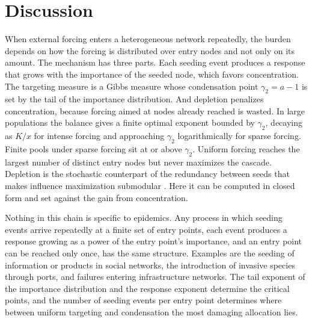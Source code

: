 \documentclass[pre,twocolumn,superscriptaddress,amsmath,amssymb,floatfix]{revtex4-2}
\begin{document}
\section{Discussion}\label{sec:discussion}
When external forcing enters a heterogeneous network repeatedly, the burden
depends on how the forcing is distributed over entry nodes and not only on its
amount. The mechanism has three parts. Each seeding event produces a response that grows
with the importance of the seeded node, which favors concentration. The
targeting measure is a Gibbs measure whose condensation point $\gamma_2=a-1$ is set by
the tail of the importance distribution. And depletion penalizes
concentration, because forcing aimed at nodes already reached is wasted. In large
populations the balance gives a finite optimal exponent bounded by $\gamma_2$, decaying as $K/x$ for
intense forcing and approaching $\gamma_2$ logarithmically for sparse forcing. Finite
pools under sparse forcing sit at or above $\gamma_2$.
Uniform forcing reaches the largest number of distinct entry nodes but never
maximizes the cascade.
Depletion is the stochastic counterpart of the redundancy between seeds that
makes influence maximization submodular \cite{kempe2003maximizing}. Here it
can be computed in closed form and set against the gain from concentration.

Nothing in this chain is specific to epidemics. Any process in which seeding
events arrive repeatedly at a finite set of entry points, each event produces
a response growing as a power of the entry point's importance, and an entry
point can be reached only once, has the same structure. Examples are the
seeding of information or products in social networks, the introduction of
invasive species through ports, and failures entering infrastructure networks.
The tail exponent of the importance distribution and the response exponent
determine the critical points, and the number of seeding events per entry
point determines where between uniform targeting and condensation the most
damaging allocation lies.
\end{document}
